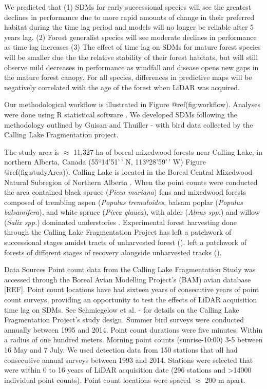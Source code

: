 \documentclass[preprint, 3p,
authoryear]{elsarticle} %
\begin{document}
We predicted that (1) SDMs for early successional species will see the
greatest declines in performance due to more rapid amounts of change in
their preferred habitat during the time lag period and models will no
longer be reliable after 5 years lag. (2) Forest generalist species will
see moderate declines in performance as time lag increases (3) The
effect of time lag on SDMs for mature forest species will be smaller due
the the relative stability of their forest habitats, but will still
observe mild decreases in performance as windfall and disease opens new
gaps in the mature forest canopy. For all species, differences in
predictive maps will be negatively correlated with the age of the forest
when LiDAR was acquired.

Our methodological workflow is illustrated in Figure @ref(fig:workflow).
Analyses were done using R statistical software \citep{R-base}. We
developed SDMs following the methodology outlined by Guisan and Thuiller
-\citet{Guisan2005} with bird data collected by the Calling Lake
Fragmentation project.

The study area is \(\approx\) 11,327 ha of boreal mixedwood forests near
Calling Lake, in northern Alberta, Canada (55º14'51'\,' N, 113º28'59'\,'
W) Figure @ref(fig:studyArea)). Calling Lake is located in the Boreal
Central Mixedwood Natural Subregion of Northern Alberta
\citep{Downing2006}. When the point counts were conducted the area
contained black spruce (\emph{Picea mariana}) fens and mixedwood forests
composed of trembling aspen (\emph{Populus tremuloides}, balsam poplar
(\emph{Populus balsamifera}), and white spruce (\emph{Picea glauca}),
with alder (\emph{Alnus spp.}) and willow (\emph{Salix spp.}) dominated
understories \citep{Schmiegelow1997}. Experimental forest harvesting
done through the Calling Lake Fragmentation Project has left a patchwork
of successional stages amidst tracts of unharvested forest
(\citet{Schmiegelow1997}). left a patchwork of forests of different
stages of recovery alongside unharvested tracks
(\citet{Schmiegelow1997}).

Data Sources Point count data from the Calling Lake Fragmentation Study
was accessed through the Boreal Avian Modelling Project's (BAM) avian
database {[}REF{]}. Point count locations have had sixteen years of
consecutive years of point count surveys, providing an opportunity to
test the effects of LiDAR acquisition time lag on SDMs. See Schmiegelow
et al. -\citet{Schmiegelow1997} for details on the Calling Lake
Fragmentation Project's study design. Summer bird surveys were conducted
annually between 1995 and 2014. Point count durations were five minutes.
Within a radius of one hundred meters. Morning point counts
(sunrise-10:00) 3-5 between 16 May and 7 July. We used detection data
from 150 stations that all had consecutive annual surveys between 1993
and 2014. Stations were selected that were within 0 to 16 years of LiDAR
acquisition date (296 stations and \textgreater14000 individual point
counts). Point count locations were spaced \(\approx\) 200 m apart.
\end{document}
